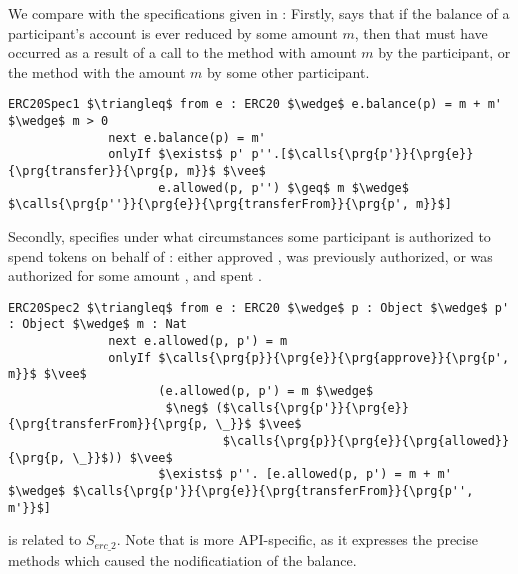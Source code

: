 
\vspace{1cm}

We compare with the specifications given in \cite{OOPSLA22}:
 Firstly,  
says that if the balance of a participant's account is ever reduced by some amount $m$, then
that must have occurred as a result of a call to the  method with amount $m$ by the participant,
or the  method with the amount $m$ by some other participant.
\begin{lstlisting}[language = Chainmail, mathescape=true, frame=lines]
ERC20Spec1 $\triangleq$ from e : ERC20 $\wedge$ e.balance(p) = m + m' $\wedge$ m > 0
              next e.balance(p) = m'
              onlyIf $\exists$ p' p''.[$\calls{\prg{p'}}{\prg{e}}{\prg{transfer}}{\prg{p, m}}$ $\vee$ 
                     e.allowed(p, p'') $\geq$ m $\wedge$ $\calls{\prg{p''}}{\prg{e}}{\prg{transferFrom}}{\prg{p', m}}$]
\end{lstlisting}
Secondly,  specifies under what circumstances some participant  is authorized to 
spend  tokens on behalf of : either  approved ,  was previously authorized,
or  was authorized for some amount , and spent .
\begin{lstlisting}[language = Chainmail, mathescape=true, frame=lines]
ERC20Spec2 $\triangleq$ from e : ERC20 $\wedge$ p : Object $\wedge$ p' : Object $\wedge$ m : Nat
              next e.allowed(p, p') = m
              onlyIf $\calls{\prg{p}}{\prg{e}}{\prg{approve}}{\prg{p', m}}$ $\vee$ 
                     (e.allowed(p, p') = m $\wedge$ 
                      $\neg$ ($\calls{\prg{p'}}{\prg{e}}{\prg{transferFrom}}{\prg{p, \_}}$ $\vee$ 
                              $\calls{\prg{p}}{\prg{e}}{\prg{allowed}}{\prg{p, \_}}$)) $\vee$
                     $\exists$ p''. [e.allowed(p, p') = m + m' $\wedge$ $\calls{\prg{p'}}{\prg{e}}{\prg{transferFrom}}{\prg{p'', m'}}$]
\end{lstlisting}

 is related to $S_{erc\_2}$. Note that  is more API-specific, as it expresses the precise methods which caused the nodificatiation of the balance.
%
%